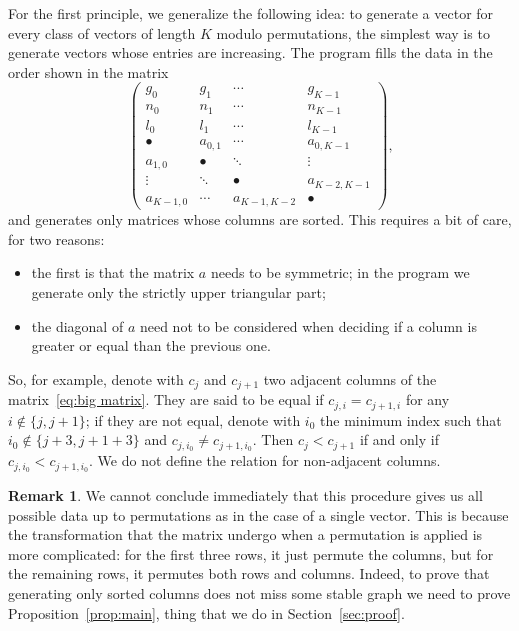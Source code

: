 \documentclass{amsart}
\theoremstyle{plain}
\theoremstyle{definition}
\newtheorem{remark}[theorem]{Remark}
\begin{document}
For the first principle, we generalize the following idea: to generate
a vector for every class of vectors of length $K$ modulo permutations,
the simplest way is to generate vectors whose entries are
increasing. The program fills the data in the order shown in the matrix
\begin{equation}\label{eq:big matrix}
  \begin{pmatrix}
    g_0 & g_1 & \cdots & g_{K-1}\\
    n_0 & n_1 & \cdots & n_{K-1}\\
    l_0 & l_1 & \cdots & l_{K-1}\\
    \hline
    \bullet & a_{0,1} & \cdots & a_{0,K-1}\\
    a_{1,0} & \bullet & \ddots & \vdots\\
    \vdots & \ddots & \bullet & a_{K-2,K-1}\\
    a_{K-1,0} & \cdots & a_{K-1,K-2} & \bullet
  \end{pmatrix}\text{,}
\end{equation}
and generates only matrices whose columns are sorted. This requires a
bit of care, for two reasons:
\begin{itemize}
\item the first is that the matrix $a$ needs to be symmetric; in the
  program we generate only the strictly upper triangular part;
\item the diagonal of $a$ need not to be considered when deciding if a
  column is greater or equal than the previous one.
\end{itemize}
So, for example, denote with $c_j$ and $c_{j+1}$ two adjacent columns
of the matrix~\ref{eq:big matrix}. They are said to be equal if
$c_{j,i} = c_{j+1,i}$ for any $i \notin \{j, j+1\}$; if they are not
equal, denote with $i_0$ the minimum index such that $i_0 \notin \{
j+3, j+1+3\}$ and $c_{j,i_0} \neq c_{j+1,i_0}$. Then $c_j < c_{j+1}$
if and only if $c_{j,i_0} < c_{j+1,i_0}$. We do not define the
relation for non-adjacent columns.

\begin{remark}
  We cannot conclude immediately that this procedure gives us all
  possible data up to permutations as in the case of a single
  vector. This is because the transformation that the matrix undergo
  when a permutation is applied is more complicated: for the first
  three rows, it just permute the columns, but for the remaining rows,
  it permutes both rows and columns. Indeed, to prove that generating
  only sorted columns does not miss some stable graph we need to prove
  Proposition~\ref{prop:main}, thing that we do in
  Section~\ref{sec:proof}.
\end{remark}
\end{document}
